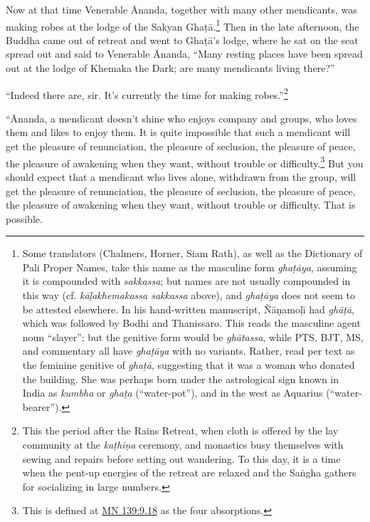 \documentclass[12pt,openany]{book}%
\begin{document}
Now at that time Venerable Ānanda, together with many other mendicants, was making robes at the lodge of the Sakyan \textsanskrit{Ghaṭā}.\footnote{Some translators (Chalmers, Horner, Siam Rath), as well as the Dictionary of Pali Proper Names, take this name as the masculine form \textit{\textsanskrit{ghaṭāya}}, assuming it is compounded with \textit{sakkassa}; but names are not usually compounded in this way (cf. \textit{\textsanskrit{kāḷakhemakassa} sakkassa} above), and \textit{\textsanskrit{ghaṭāya}} does not seem to be attested elsewhere. In his hand-written manuscript, \textsanskrit{Ñāṇamoḷī} had \textit{\textsanskrit{ghāṭā}}, which was followed by Bodhi and Thanissaro. This reads the masculine agent noun “slayer”; but the genitive form would be \textit{\textsanskrit{ghātassa}}, while PTS, BJT, MS, and commentary all have \textit{\textsanskrit{ghaṭāya}} with no variants. Rather, read per text as the feminine genitive of \textit{\textsanskrit{ghaṭā}}, suggesting that it was a woman who donated the building. She was perhaps born under the astrological sign known in India as \textit{kumbha} or \textit{\textsanskrit{ghaṭa}} (“water-pot”), and in the west as Aquarius (“water-bearer”). } Then in the late afternoon, the Buddha came out of retreat and went to \textsanskrit{Ghaṭā}’s lodge, where he sat on the seat spread out and said to Venerable Ānanda, “Many resting places have been spread out at the lodge of Khemaka the Dark; are many mendicants living there?” 

“Indeed there are, sir. It’s currently the time for making robes.”\footnote{This the period after the Rains Retreat, when cloth is offered by the lay community at the \textit{\textsanskrit{kaṭhiṇa}} ceremony, and monastics busy themselves with sewing and repairs before setting out wandering. To this day, it is a time when the pent-up energies of the retreat are relaxed and the \textsanskrit{Saṅgha} gathers for socializing in large numbers. } 

“Ānanda, a mendicant doesn’t shine who enjoys company and groups, who loves them and likes to enjoy them. It is quite impossible that such a mendicant will get the pleasure of renunciation, the pleasure of seclusion, the pleasure of peace, the pleasure of awakening when they want, without trouble or difficulty.\footnote{This is defined at \href{https://suttacentral.net/mn139/en/sujato\#9.18}{MN 139:9.18} as the four absorptions. } But you should expect that a mendicant who lives alone, withdrawn from the group, will get the pleasure of renunciation, the pleasure of seclusion, the pleasure of peace, the pleasure of awakening when they want, without trouble or difficulty. That is possible. 
\end{document}
